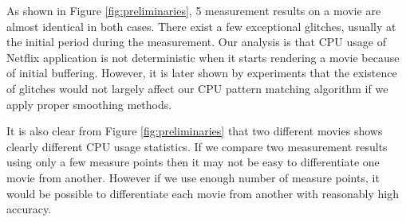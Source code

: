 As shown in Figure \ref{fig:preliminaries}, 5 measurement results on a movie are almost identical in both cases. 
There exist a few exceptional glitches, usually at the initial period during the measurement. 
Our analysis is that CPU usage of Netflix application is not deterministic when it starts rendering a movie because of initial buffering.
However, it is later shown by experiments that the existence of glitches would not largely affect our CPU pattern matching algorithm if we apply proper smoothing methods. 

It is also clear from Figure \ref{fig:preliminaries} that two different movies shows clearly different CPU usage statistics. 
If we compare two measurement results using only a few measure points then it may not be easy to differentiate one movie from another.
However if we use enough number of measure points, it would be possible to differentiate each movie from another with reasonably high accuracy. 


